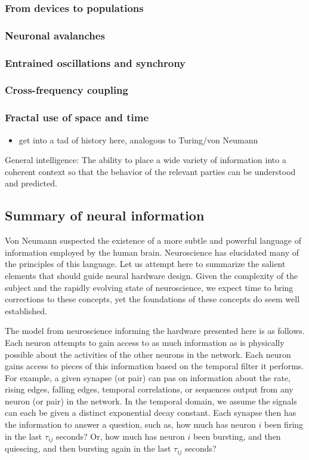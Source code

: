 \documentclass[twocolumn]{article}
\begin{document}
\subsubsection{From devices to populations}

\subsubsection{Neuronal avalanches}

\subsubsection{Entrained oscillations and synchrony}

\subsubsection{Cross-frequency coupling}

\subsubsection{Fractal use of space and time}


\begin{itemize}
\item get into a tad of history here, analogous to Turing/von Neumann
\end{itemize}

General intelligence: The ability to place a wide variety of information into a coherent context so that the behavior of the relevant parties can be understood and predicted.

\subsection{Summary of neural information}
Von Neumann suspected the existence of a more subtle and powerful language of information employed by the human brain. Neuroscience has elucidated many of the principles of this language. Let us attempt here to summarize the salient elements that should guide neural hardware design. Given the complexity of the subject and the rapidly evolving state of neuroscience, we expect time to bring corrections to these concepts, yet the foundations of these concepts do seem well established.

The model from neuroscience informing the hardware presented here is as follows. Each neuron attempts to gain access to as much information as is physically possible about the activities of the other neurons in the network. Each neuron gains access to pieces of this information based on the temporal filter it performs. For example, a given synapse (or pair) can pas on information about the rate, rising edges, falling edges, temporal correlations, or sequences output from any neuron (or pair) in the network. In the temporal domain, we assume the signals can each be given a distinct exponential decay constant. Each synapse then has the information to answer a question, such as, how much has neuron $i$ been firing in the last $\tau_{ij}$ seconds? Or, how much has neuron $i$ been bursting, and then quiescing, and then bursting again in the last $\tau_{ij}$ seconds? 
\end{document}
